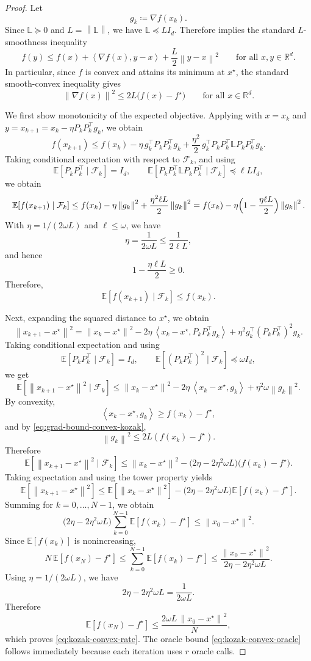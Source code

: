 \documentclass[10pt]{article}
\newcommand{\E}{\mathbb{E}}
\newcommand{\F}{\mathcal{F}}
\newcommand{\R}{\mathbb{R}}
\newcommand{\ip}[2]{\left\langle #1,#2\right\rangle}
\newcommand{\norm}[1]{\left\|#1\right\|}
\newcommand{\Lmat}{\mathbb{L}}
\begin{document}
\begin{proof}
Let
\[
g_k\coloneqq \nabla f(x_k).
\]
Since \(\Lmat\succeq 0\) and \(L=\norm{\Lmat}\), we have \(\Lmat\preceq LI_d\).
Therefore  implies the standard \(L\)-smoothness
inequality
\[
f(y)\le f(x)+\ip{\nabla f(x)}{y-x}+\frac{L}{2}\norm{y-x}^2
\qquad\text{for all }x,y\in\R^d.
\]
In particular, since \(f\) is convex and attains its minimum at \(x^\star\),
the standard smooth-convex inequality gives
\begin{equation}
\norm{\nabla f(x)}^2 \le 2L\bigl(f(x)-f^\star\bigr)
\qquad\text{for all }x\in\R^d.
\label{eq:grad-bound-convex-kozak}
\end{equation}

We first show monotonicity of the expected objective.
Applying  with
\(x=x_k\) and \(y=x_{k+1}=x_k-\eta P_kP_k^\top g_k\), we obtain
\[
f(x_{k+1})
\le
f(x_k)-\eta\, g_k^\top P_kP_k^\top g_k
+\frac{\eta^2}{2}\, g_k^\top P_kP_k^\top \Lmat P_kP_k^\top g_k.
\]
Taking conditional expectation with respect to \(\F_k\), and using
\[
\E[P_kP_k^\top\mid \F_k]=I_d,
\qquad
\E[P_kP_k^\top \Lmat P_kP_k^\top\mid \F_k]\preceq \ell L I_d,
\]
we obtain
\[
\E[f(x_{k+1})\mid \F_k]
\le
f(x_k)-\eta\norm{g_k}^2+\frac{\eta^2\ell L}{2}\norm{g_k}^2
=
f(x_k)-\eta\Bigl(1-\frac{\eta\ell L}{2}\Bigr)\norm{g_k}^2.
\]
With \(\eta=1/(2\omega L)\) and \(\ell\le \omega\), we have
\[
\eta=\frac{1}{2\omega L}\le \frac{1}{2\ell L},
\]
and hence
\[
1-\frac{\eta\ell L}{2}\ge 0.
\]
Therefore,
\[
\E[f(x_{k+1})\mid \F_k]\le f(x_k).
\]

Next, expanding the squared distance to \(x^\star\), we obtain
\[
\norm{x_{k+1}-x^\star}^2
=
\norm{x_k-x^\star}^2
-2\eta\,\ip{x_k-x^\star}{P_kP_k^\top g_k}
+\eta^2 g_k^\top (P_kP_k^\top)^2 g_k.
\]
Taking conditional expectation and using
\[
\E[P_kP_k^\top\mid \F_k]=I_d,
\qquad
\E[(P_kP_k^\top)^2\mid \F_k]\preceq \omega I_d,
\]
we get
\[
\E[\norm{x_{k+1}-x^\star}^2\mid \F_k]
\le
\norm{x_k-x^\star}^2
-2\eta\,\ip{x_k-x^\star}{g_k}
+\eta^2\omega \norm{g_k}^2.
\]
By convexity,
\[
\ip{x_k-x^\star}{g_k}\ge f(x_k)-f^\star,
\]
and by \eqref{eq:grad-bound-convex-kozak},
\[
\norm{g_k}^2 \le 2L(f(x_k)-f^\star).
\]
Therefore
\[
\E[\norm{x_{k+1}-x^\star}^2\mid \F_k]
\le
\norm{x_k-x^\star}^2
-\bigl(2\eta-2\eta^2\omega L\bigr)\bigl(f(x_k)-f^\star\bigr).
\]
Taking expectation and using the tower property yields
\[
\E[\norm{x_{k+1}-x^\star}^2]
\le
\E[\norm{x_k-x^\star}^2]
-\bigl(2\eta-2\eta^2\omega L\bigr)\E[f(x_k)-f^\star].
\]
Summing for \(k=0,\dots,N-1\), we obtain
\[
\bigl(2\eta-2\eta^2\omega L\bigr)\sum_{k=0}^{N-1}\E[f(x_k)-f^\star]
\le
\norm{x_0-x^\star}^2.
\]
Since \(\E[f(x_k)]\) is nonincreasing,
\[
N\,\E[f(x_N)-f^\star]
\le
\sum_{k=0}^{N-1}\E[f(x_k)-f^\star]
\le
\frac{\norm{x_0-x^\star}^2}{2\eta-2\eta^2\omega L}.
\]
Using \(\eta=1/(2\omega L)\), we have
\[
2\eta-2\eta^2\omega L=\frac{1}{2\omega L}.
\]
Therefore
\[
\E[f(x_N)-f^\star]
\le
\frac{2\omega L\,\norm{x_0-x^\star}^2}{N},
\]
which proves \eqref{eq:kozak-convex-rate}.
The oracle bound
\eqref{eq:kozak-convex-oracle} follows immediately because each iteration uses
\(r\) oracle calls.
\end{proof}
\end{document}
